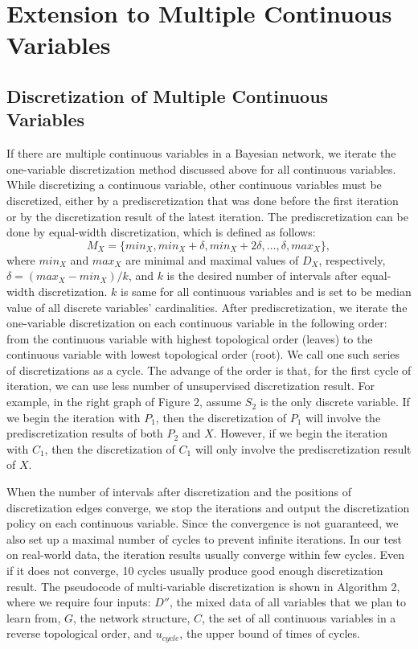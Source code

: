 
\section{Extension to Multiple Continuous Variables}
\label{sec:multi_var}

\subsection{Discretization of Multiple Continuous Variables}

If there are multiple continuous variables in a Bayesian network, we iterate the one-variable discretization method discussed above for all continuous variables. While discretizing a continuous variable, other continuous variables must be discretized, either by a prediscretization that was done before the first iteration or by the discretization result of the latest iteration. The prediscretization can be done by equal-width discretization, which is defined as follows:
\begin{equation}
M_X =  \{ min_X, min_X + \delta, min_X + 2\delta, \ldots, \delta, max_X \},
\end{equation}
where $min_X$ and $max_X$ are minimal and maximal values of $D_X$, respectively, $\delta =  (max_X - min_X)/k$, and $k$ is the desired number of intervals after equal-width discretization. $k$ is same for all continuous variables and is set to be median value of all discrete variables' cardinalities. After prediscretization, we iterate the one-variable discretization on each continuous variable in the following order: from the continuous variable with highest topological order (leaves) to the continuous variable with lowest topological order (root). We call one such series of discretizations as a cycle. The advange of the order is that, for the first cycle of iteration, we can use less number of unsupervised discretization result. For example, in the right graph of Figure 2, assume $S_2$ is the only discrete variable. If we begin the iteration with $P_1$, then the discretization of $P_1$ will involve the prediscretization results of both $P_2$ and $X$. However, if we begin the iteration with $C_1$, then the discretization of $C_1$ will only involve the prediscretization result of $X$.

When the number of intervals after discretization and the positions of discretization edges converge, we stop the iterations and output the discretization policy on each continuous variable. Since the convergence is not guaranteed, we also set up a maximal number of cycles to prevent infinite iterations. In our test on real-world data, the iteration results usually converge within few cycles. Even if it does not converge, 10 cycles usually produce good enough discretization result. The pseudocode of multi-variable discretization is shown in Algorithm 2, where we require four inputs: $D''$, the mixed data of all variables that we plan to learn from, $G$, the network structure, $C$, the set of all continuous variables in a reverse topological order, and $u_{cycle}$, the upper bound of times of cycles.

